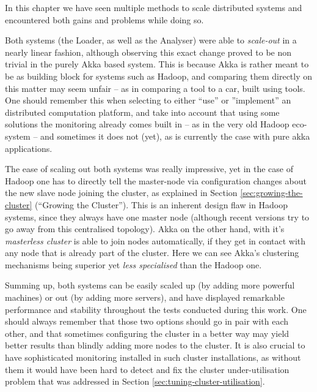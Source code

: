 In this chapter we have seen multiple methods to scale distributed systems and encountered both gains and problems while doing so.

Both systems (the Loader, as well as the Analyser) were able to \textit{scale-out} in a nearly linear fashion, although observing this exact change proved to be non trivial in the purely Akka based system. This is because Akka is rather meant to be as building block for systems such as Hadoop, and comparing them directly on this matter may seem unfair -- as in comparing a tool to a car, built using tools. One should remember this when selecting to either ``use'' or ''implement'' an distributed computation platform, and take into account that using some solutions the monitoring already comes built in -- as in the very old Hadoop eco-system -- and sometimes it does not (yet), as is currently the case with pure akka applications.

The ease of scaling out both systems was really impressive, yet in the case of Hadoop one has to directly tell the master-node via configuration changes about the new slave node joining the cluster, as explained in Section \ref{sec:growing-the-cluster} (``Growing the Cluster''). This is an inherent design flaw in Hadoop systems, since they always have one master node (although recent versions try to go away from this centralised topology). Akka on the other hand, with it's \textit{masterless cluster} is able to join nodes automatically, if they get in contact with any node that is already part of the cluster. Here we can see Akka's clustering mechanisms being superior yet \textit{less specialised} than the Hadoop one.

Summing up, both systems can be easily scaled up (by adding more powerful machines) or out (by adding more servers), and have displayed remarkable performance and stability throughout the tests conducted during this work. One should always remember that those two options should go in pair with each other, and that sometimes configuring the cluster in a better way may yield better results than blindly adding more nodes to the cluster. It is also crucial to have sophisticated monitoring installed in such cluster installations, as without them it would have been hard to detect and fix the cluster under-utilisation problem that was addressed in Section \ref{sec:tuning-cluster-utilisation}.


